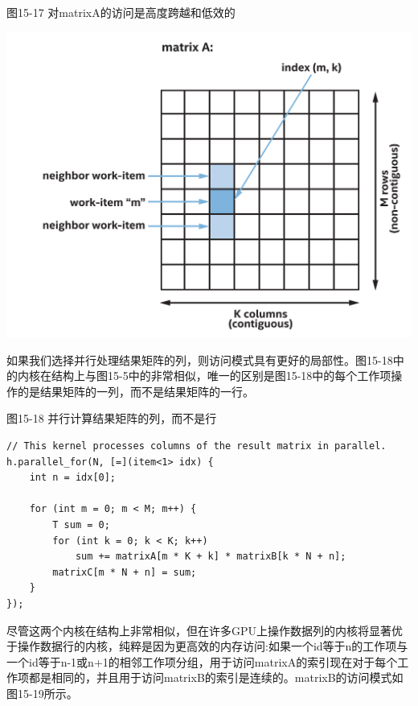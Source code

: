 \hspace*{\fill} \par %
图15-17 对matrixA的访问是高度跨越和低效的
\begin{center}
	\includegraphics[width=1.0\textwidth]{content/chapter-15/images/13}
\end{center}

如果我们选择并行处理结果矩阵的列，则访问模式具有更好的局部性。图15-18中的内核在结构上与图15-5中的非常相似，唯一的区别是图15-18中的每个工作项操作的是结果矩阵的一列，而不是结果矩阵的一行。\par

\hspace*{\fill} \par %
图15-18 并行计算结果矩阵的列，而不是行
\begin{lstlisting}[caption={}]
// This kernel processes columns of the result matrix in parallel.
h.parallel_for(N, [=](item<1> idx) {
	int n = idx[0];
	
	for (int m = 0; m < M; m++) {
		T sum = 0;
		for (int k = 0; k < K; k++)
			sum += matrixA[m * K + k] * matrixB[k * N + n];
		matrixC[m * N + n] = sum;
	}
});
\end{lstlisting}

尽管这两个内核在结构上非常相似，但在许多GPU上操作数据列的内核将显著优于操作数据行的内核，纯粹是因为更高效的内存访问:如果一个id等于n的工作项与一个id等于n-1或n+1的相邻工作项分组，用于访问matrixA的索引现在对于每个工作项都是相同的，并且用于访问matrixB的索引是连续的。matrixB的访问模式如图15-19所示。\par

